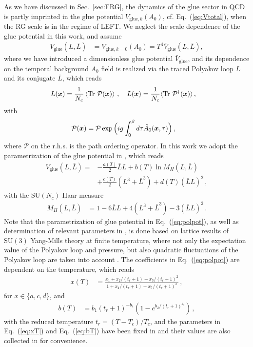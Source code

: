 \documentclass[%
reprint,
superscriptaddress,
showpacs,preprintnumbers,
 amsmath,amssymb,
 aps,
prd,
]{revtex4-1}
\newcommand{\Tr}{\ensuremath{\operatorname{Tr}}}
\def\Eq#1{Eq.~(\ref{#1})}
\def\sec#1{Sec.~\ref{#1}}
\begin{document}
As we have discussed in \sec{sec:FRG}, the dynamics of the glue sector in QCD is partly imprinted in the glue potential $V_{\mathrm{glue},k}(A_0)$, cf. \Eq{eq:Vtotal}, when the RG scale is in the regime of LEFT. We neglect the scale dependence of the glue potential in this work, and assume
%
\begin{align}
   V_\mathrm{glue}(L,\bar{L})&=V_{\mathrm{glue},k=0}(A_0)=T^4 \bar V_\mathrm{glue}(L,\bar{L}),\label{}
\end{align}
%
where we have introduced a dimensionless glue potential $\bar V_\mathrm{glue}$, and its dependence on the temporal background $A_0$ field is realized via the traced Polyakov loop $L$ and its conjugate $\bar{L}$, which reads
%
\begin{align}
  L(\bm{x})&=\frac{1}{N_c} \left\langle \Tr\, {\cal P}(\bm x)\right\rangle\,,\quad  \bar L (\bm{x})=\frac{1}{N_c} \langle \Tr\,{\cal P}^{\dagger}(\bm x)\rangle \,,\label{eq:Lloop}
\end{align}
%
with 
%
\begin{align}
  {\cal P}(\bm x)&=\mathcal{P}\exp\Big(ig\int_0^{\beta}d\tau \hat A_0(\bm{x},\tau)\Big)\,, \label{eq:Ploop}
\end{align}
%
where $\mathcal{P}$ on the r.h.s. is the path ordering operator. In this work we adopt the parametrization of the glue potential in \cite{Lo:2013hla}, which reads
%
\begin{align}
  V_\text{glue}(L,\bar{L})=& -\frac{a(T)}{2} \bar L L + b(T)\ln M_H(L,\bar{L})\nonumber \\[2ex]
  &+ \frac{c(T)}{2} (L^3+\bar L^3) + d(T) (\bar{L} L)^2\,,
                             \label{eq:polpot}
\end{align}
%
with the $\mathrm{SU}(N_c)$ Haar measure
%
\begin{align}
  M_H (L, \bar{L})&= 1 -6 \bar{L}L + 4 (L^3+\bar{L}^3) - 3  (\bar{L}L)^2\,.
\end{align}
%
Note that the parametrization of glue potential in \Eq{eq:polpot}, as well as determination of relevant parameters in , is done based on lattice results of  $\mathrm{SU}(3)$ Yang-Mills theory at finite temperature, where not only the expectation value of the Polyakov loop and pressure, but also quadratic fluctuations of the Polyakov loop are taken into account \cite{Lo:2013hla}. The coefficients in \Eq{eq:polpot} are dependent on the temperature, which reads
%
\begin{align}
  x(T) &= \frac{x_1 + x_2/(t_r+1) + x_3/(t_r+1)^2}{1 + x_4/(t_r+1) + x_5/(t_r+1)^2}\,,\label{eq:xT}
\end{align}
%
for $x\in \{a, c, d\}$, and 
%
\begin{align}
  b(T) &=b_1 (t_r+1)^{-b_4}\left (1 -e^{b_2/(t_r+1)^{b_3}} \right)\,,\label{eq:bT}
\end{align}
%
with the reduced temperature $t_r=(T-T_c)/T_c$, and the parameters in \Eq{eq:xT} and \Eq{eq:bT} have been fixed in \cite{Lo:2013hla} and their values are also collected in  for convenience.
\end{document}
